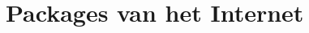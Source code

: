 \documentclass[a4paper,12pt,twoside,openright,titlepage]{book}
\begin{document}
\section{Packages van het Internet}



\backmatter
\printindex
\end{document}
